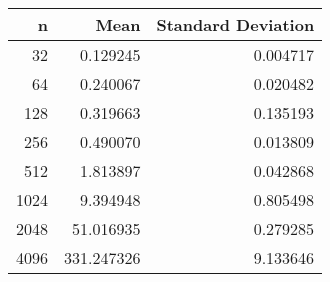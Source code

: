 \begin{tabular}{rrr}
\toprule
    n &        Mean &  Standard Deviation \\
\midrule
   32 &    0.129245 &            0.004717 \\
   64 &    0.240067 &            0.020482 \\
  128 &    0.319663 &            0.135193 \\
  256 &    0.490070 &            0.013809 \\
  512 &    1.813897 &            0.042868 \\
 1024 &    9.394948 &            0.805498 \\
 2048 &   51.016935 &            0.279285 \\
 4096 &  331.247326 &            9.133646 \\
\bottomrule
\end{tabular}
